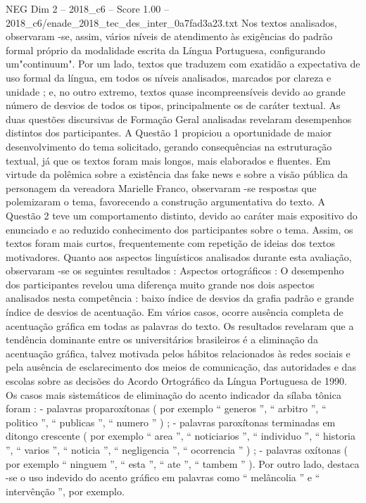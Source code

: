 \begin{textsample}{NEG Dim 2 – 2018\_c6 – Score 1.00 – 2018\_c6/enade\_2018\_tec\_des\_inter\_0a7fad3a23.txt}
Nos textos analisados, observaram -se, assim, vários níveis de atendimento às exigências do padrão formal próprio da modalidade escrita da Língua Portuguesa, configurando um"continuum".
Por um lado, textos que traduzem com exatidão a expectativa de uso formal da língua, em todos os níveis analisados, marcados por clareza e unidade ; e, no outro extremo, textos quase incompreensíveis devido ao grande número de desvios de todos os tipos, principalmente os de caráter textual.
As duas questões discursivas de Formação Geral analisadas revelaram desempenhos distintos dos participantes.
A Questão 1 propiciou a oportunidade de maior desenvolvimento do tema solicitado, gerando consequências na estruturação textual, já que os textos foram mais longos, mais elaborados e fluentes.
Em virtude da polêmica sobre a existência das fake news e sobre a visão pública da personagem da vereadora Marielle Franco, observaram -se respostas que polemizaram o tema, favorecendo a construção argumentativa do texto.
A Questão 2 teve um comportamento distinto, devido ao caráter mais expositivo do enunciado e ao reduzido conhecimento dos participantes sobre o tema.
Assim, os textos foram mais curtos, frequentemente com repetição de ideias dos textos motivadores.
Quanto aos aspectos linguísticos analisados durante esta avaliação, observaram -se os seguintes resultados : Aspectos ortográficos : O desempenho dos participantes revelou uma diferença muito grande nos dois aspectos analisados nesta competência : baixo índice de desvios da grafia padrão e grande índice de desvios de acentuação.
Em vários casos, ocorre ausência completa de acentuação gráfica em todas as palavras do texto.
Os resultados revelaram que a tendência dominante entre os universitários brasileiros é a eliminação da acentuação gráfica, talvez motivada pelos hábitos relacionados às redes sociais e pela ausência de esclarecimento dos meios de comunicação, das autoridades e das escolas sobre as decisões do Acordo Ortográfico da Língua Portuguesa de 1990.
Os casos mais sistemáticos de eliminação do acento indicador da sílaba tônica foram : - palavras proparoxítonas ( por exemplo “ generos ”, “ arbitro ”, “ politico ”, “ publicas ”, “ numero ” ) ; - palavras paroxítonas terminadas em ditongo crescente ( por exemplo “ area ”, “ noticiarios ”, “ individuo ”, “ historia ”, “ varios ”, “ noticia ”, “ negligencia ”, “ ocorrencia ” ) ; - palavras oxítonas ( por exemplo “ ninguem ”, “ esta ”, “ ate ”, “ tambem ” ).
Por outro lado, destaca -se o uso indevido do acento gráfico em palavras como “ melâncolia ” e “ intervênção ”, por exemplo.

\end{textsample}

